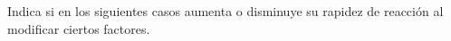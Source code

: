 Indica si en los siguientes casos aumenta o disminuye su rapidez de reacción al modificar ciertos factores.
\begin{parts}
    
    
    
    
    
\end{parts}
